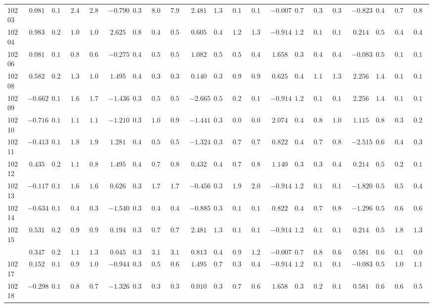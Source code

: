 \documentclass[6pt]{article}
\begin{document}
\begin{landscape}
{\begin{longtable}{lrrrrrrrrrrrrrrrrrrrr}
10203&$ 0.081$&$0.188$&$2.427$&$2.880$&$-0.790$&$0.389$&$8.029$&$7.999$&$ 2.481$&$1.316$&$0.105$&$0.119$&$-0.007$&$0.714$&$0.316$&$0.348$&$-0.823$&$0.499$&$0.796$&$0.836$\tabularnewline
10204&$ 0.983$&$0.298$&$1.019$&$1.077$&$ 2.625$&$0.830$&$0.476$&$0.536$&$ 0.605$&$0.448$&$1.257$&$1.383$&$-0.914$&$1.254$&$0.135$&$0.149$&$ 0.214$&$0.594$&$0.498$&$0.462$\tabularnewline
10206&$ 0.081$&$0.188$&$0.802$&$0.674$&$-0.275$&$0.402$&$0.520$&$0.525$&$ 1.082$&$0.578$&$0.504$&$0.410$&$ 1.658$&$0.376$&$0.425$&$0.464$&$-0.083$&$0.547$&$0.104$&$0.101$\tabularnewline
10208&$ 0.582$&$0.233$&$1.369$&$1.071$&$ 1.495$&$0.495$&$0.379$&$0.346$&$ 0.140$&$0.376$&$0.917$&$0.940$&$ 0.625$&$0.488$&$1.162$&$1.350$&$ 2.256$&$1.456$&$0.164$&$0.191$\tabularnewline
10209&$-0.662$&$0.166$&$1.676$&$1.710$&$-1.436$&$0.337$&$0.586$&$0.597$&$-2.665$&$0.591$&$0.229$&$0.180$&$-0.914$&$1.254$&$0.135$&$0.149$&$ 2.256$&$1.456$&$0.164$&$0.191$\tabularnewline
10210&$-0.716$&$0.166$&$1.157$&$1.122$&$-1.210$&$0.352$&$1.032$&$0.992$&$-1.441$&$0.354$&$0.066$&$0.068$&$ 2.074$&$0.423$&$0.873$&$1.001$&$ 1.115$&$0.851$&$0.303$&$0.292$\tabularnewline
10211&$-0.413$&$0.169$&$1.845$&$1.928$&$ 1.281$&$0.457$&$0.565$&$0.578$&$-1.324$&$0.346$&$0.741$&$0.764$&$ 0.822$&$0.443$&$0.740$&$0.814$&$-2.515$&$0.681$&$0.463$&$0.364$\tabularnewline
10212&$ 0.435$&$0.216$&$1.137$&$0.867$&$ 1.495$&$0.495$&$0.770$&$0.812$&$ 0.432$&$0.415$&$0.713$&$0.827$&$ 1.140$&$0.395$&$0.373$&$0.451$&$ 0.214$&$0.594$&$0.216$&$0.194$\tabularnewline
10213&$-0.117$&$0.178$&$1.603$&$1.681$&$ 0.626$&$0.393$&$1.743$&$1.790$&$-0.456$&$0.337$&$1.967$&$2.002$&$-0.914$&$1.254$&$0.135$&$0.149$&$-1.820$&$0.555$&$0.539$&$0.451$\tabularnewline
10214&$-0.634$&$0.166$&$0.420$&$0.397$&$-1.540$&$0.332$&$0.482$&$0.499$&$-0.885$&$0.332$&$0.140$&$0.141$&$ 0.822$&$0.443$&$0.742$&$0.866$&$-1.296$&$0.509$&$0.617$&$0.639$\tabularnewline
10215&$ 0.531$&$0.227$&$0.983$&$0.952$&$ 0.194$&$0.389$&$0.780$&$0.781$&$ 2.481$&$1.316$&$0.105$&$0.119$&$-0.914$&$1.254$&$0.135$&$0.149$&$ 0.214$&$0.594$&$1.821$&$1.335$\tabularnewline
\newpage
10216&$ 0.347$&$0.208$&$1.114$&$1.342$&$ 0.045$&$0.393$&$3.186$&$3.120$&$ 0.813$&$0.497$&$0.948$&$1.241$&$-0.007$&$0.714$&$0.866$&$0.660$&$ 0.581$&$0.677$&$0.154$&$0.093$\tabularnewline
10217&$ 0.152$&$0.192$&$0.965$&$1.090$&$-0.944$&$0.376$&$0.591$&$0.609$&$ 1.495$&$0.741$&$0.385$&$0.451$&$-0.914$&$1.254$&$0.135$&$0.149$&$-0.083$&$0.547$&$1.077$&$1.102$\tabularnewline
10218&$-0.298$&$0.172$&$0.812$&$0.794$&$-1.326$&$0.343$&$0.387$&$0.387$&$ 0.010$&$0.363$&$0.740$&$0.683$&$ 1.658$&$0.376$&$0.227$&$0.198$&$ 0.581$&$0.677$&$0.632$&$0.507$\tabularnewline

\end{longtable}}
\end{landscape}
\end{document}
